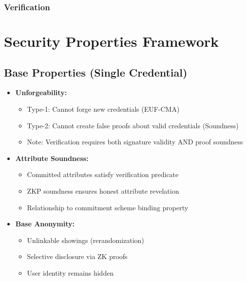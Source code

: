 \subsubsection{Verification}












\newpage
\section{Security Properties Framework}\label{new-sec-properties}
\subsection{Base Properties (Single Credential)}
\begin{itemize}
    \item \textbf{Unforgeability:}
    \begin{itemize}
        \item Type-1: Cannot forge new credentials (EUF-CMA)
        \item Type-2: Cannot create false proofs about valid credentials (Soundness)
        \item Note: Verification requires both signature validity AND proof soundness
    \end{itemize}
    
    \item \textbf{Attribute Soundness:}
    \begin{itemize}
        \item Committed attributes satisfy verification predicate
        \item ZKP soundness ensures honest attribute revelation
        \item Relationship to commitment scheme binding property
    \end{itemize}

    \item \textbf{Base Anonymity:}
    \begin{itemize}
        \item Unlinkable showings (rerandomization)
        \item Selective disclosure via ZK proofs
        \item User identity remains hidden
    \end{itemize}
\end{itemize}


